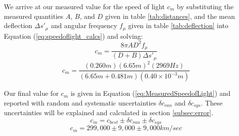 \documentclass[twocolumn]{article}
\begin{document}
	\fi

	We arrive at our measured value for the speed of light $c_m$ by substituting the measured quantities $A$, $B$, and $D$ given in table \ref{tab:distances}, and the mean deflection $\Delta s'_\mu$ and angular frequency $f_\mu$ given in table \ref{tab:deflection} into Equation (\ref{eq:speedoflight_calcs}) and solving:
	\begin{equation}
		c_{m} = \frac{8\pi AD^2 f_\mu}{(D+B)\Delta s'_\mu}
	\end{equation}
	\begin{equation}
		c_{m} = \frac{(0.260m)(6.65m)^2(2969Hz)}{(6.65m + 0.481m)(0.40\times 10^{-3}m)}
	\end{equation}
	
	Our final value for $c_m$ is given in Equation (\ref{eq:MeasuredSpeedofLight}) and reported with random and systematic uncertainties $\delta c_{ran}$ and $\delta c_{sys}$.
	These uncertainties will be explained and calculated in section \ref{subsec:error}.
	\begin{equation*}
	c_m = c_{best}\pm \delta c_{ran} \pm \delta c_{sys}
	\end{equation*}
	\begin{equation}
		\label{eq:MeasuredSpeedofLight}
		c_{m} = 299,000\pm 9,000\pm 9,000 km/sec
	\end{equation}
	
\end{document}
